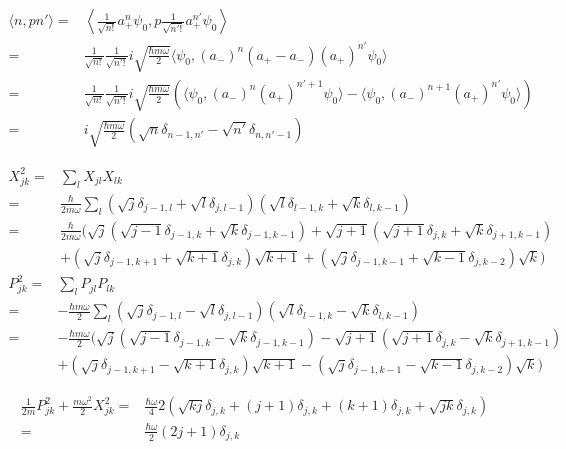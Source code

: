\begin{align*}
    \langle n,pn'\rangle
    =& \left\langle \frac{1}{\sqrt{n!}}
    a_+^n\psi_0,
    p\frac{1}{\sqrt{n'!}}a_+^{n'}\psi_0\right\rangle\\
    =&
    \frac{1}{\sqrt{n!}}
    \frac{1}{\sqrt{n'!}}
    i\sqrt{\frac{\hbar m\omega}{2}}
    \langle \psi_0, (a_-)^{n}(a_+-a_-)(a_+)^{n'}\psi_0\rangle\\
    =&\frac{1}{\sqrt{n!}}
    \frac{1}{\sqrt{n'!}}
    i\sqrt{\frac{\hbar m\omega}{2}}
    (\langle \psi_0, (a_-)^{n}(a_+)^{n'+1}\psi_0\rangle
    -\langle \psi_0, (a_-)^{n+1}(a_+)^{n'}\psi_0\rangle
    )\\
    =& i\sqrt{\frac{\hbar m\omega}{2}}(\sqrt{n}\delta_{n-1,n'}-\sqrt{n'}\delta_{n,n'-1})
\end{align*}


\begin{align*}
    X^2_{jk} =&
    \sum_{l}X_{jl}X_{lk}\\
    =&\frac{\hbar}{2m\omega}
    \sum_{l}
    (\sqrt{j}\delta_{j-1,l}+\sqrt{l}\delta_{j,l-1})
    (\sqrt{l}\delta_{l-1,k}+\sqrt{k}\delta_{l,k-1})\\
    =&\frac{\hbar}{2m\omega}
    (\sqrt{j}
    (\sqrt{j-1}\delta_{j-1,k}+
    \sqrt{k}\delta_{j-1,k-1})
    +
    \sqrt{j+1}
    (\sqrt{j+1}\delta_{j,k}+
    \sqrt{k}\delta_{j+1,k-1})\\
    &+
    (\sqrt{j}\delta_{j-1,k+1}+
    \sqrt{k+1}\delta_{j,k})\sqrt{k+1}+
    (\sqrt{j}\delta_{j-1,k-1}+
    \sqrt{k-1}\delta_{j,k-2})\sqrt{k}
    )
\end{align*}
\begin{align*}
    P^2_{jk} =&
    \sum_{l}P_{jl}P_{lk}\\
    =&-\frac{\hbar m\omega}{2}
    \sum_{l}
    (\sqrt{j}\delta_{j-1,l}-\sqrt{l}\delta_{j,l-1})
    (\sqrt{l}\delta_{l-1,k}-\sqrt{k}\delta_{l,k-1})\\
    =&-\frac{\hbar m\omega}{2}
    (\sqrt{j}
    (\sqrt{j-1}\delta_{j-1,k}-
    \sqrt{k}\delta_{j-1,k-1})
    -
    \sqrt{j+1}
    (\sqrt{j+1}\delta_{j,k}-
    \sqrt{k}\delta_{j+1,k-1})\\
    &+
    (\sqrt{j}\delta_{j-1,k+1}-
    \sqrt{k+1}\delta_{j,k})\sqrt{k+1}-
    (\sqrt{j}\delta_{j-1,k-1}-
    \sqrt{k-1}\delta_{j,k-2})\sqrt{k}
    )
\end{align*}

\begin{align*}
    \frac{1}{2m}P^2_{jk}
    +\frac{m\omega^2}{2}X^2_{jk}
    =&\frac{\hbar\omega}{4}
    2(\sqrt{kj}\delta_{j,k}+(j+1)\delta_{j,k}+(k+1)\delta_{j,k}+\sqrt{jk}\delta_{j,k})\\
    =&\frac{\hbar\omega}{2}(2j+1)\delta_{j,k}
\end{align*}

